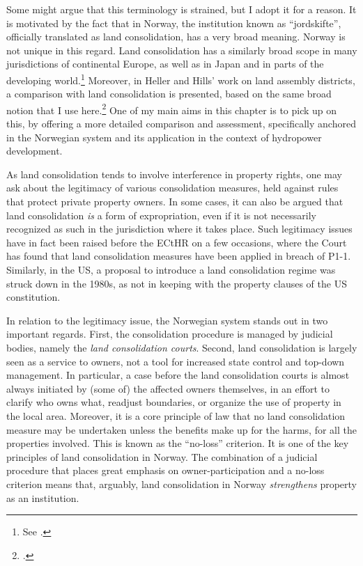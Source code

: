 Some might argue that this terminology is strained, but I adopt it for a reason. It is motivated by the fact that in Norway, the institution known as ``jordskifte'', officially translated as land consolidation, has a very broad meaning. Norway is not unique in this regard. Land consolidation has a similarly broad scope in many jurisdictions of continental Europe, as well as in Japan and in parts of the developing world.\footnote{See \cite{sky07;viliainen04}.} Moreover, in Heller and Hills' work on land assembly districts, a comparison with land consolidation is presented, based on the same broad notion that I use here.\footcite{heller08} One of my main aims in this chapter is to pick up on this, by offering a more detailed comparison and assessment, specifically anchored in the Norwegian system and its application in the context of hydropower development.

As land consolidation tends to involve interference in property rights, one may ask about the legitimacy of various consolidation measures, held against rules that protect private property owners. In some cases, it can also be argued that land consolidation {\it is } a form of expropriation, even if it is not necessarily recognized as such in the jurisdiction where it takes place. Such legitimacy issues have in fact been raised before the ECtHR on a few occasions, where the Court has found that land consolidation measures have been applied in breach of P1-1. Similarly, in the US, a proposal to introduce a land consolidation regime was struck down in the 1980s, as not in keeping with the property clauses of the US constitution.


In relation to the legitimacy issue, the Norwegian system stands out in two important regards. First, the consolidation procedure is managed by judicial bodies, namely the {\it land consolidation courts}. Second, land consolidation is largely seen as a service to owners, not a tool for increased state control and top-down management. In particular, a case before the land consolidation courts is almost always initiated by (some of) the affected owners themselves, in an effort to clarify who owns what, readjust boundaries, or organize the use of property in the local area. Moreover, it is a core principle of law that no land consolidation measure may be undertaken unless the benefits make up for the harms, for all the properties involved. This is known as the ``no-loss'' criterion. It is one of the key principles of land consolidation in Norway. The combination of a judicial procedure that places great emphasis on owner-participation and a no-loss criterion means that, arguably, land consolidation in Norway {\it strengthens} property as an institution. 

